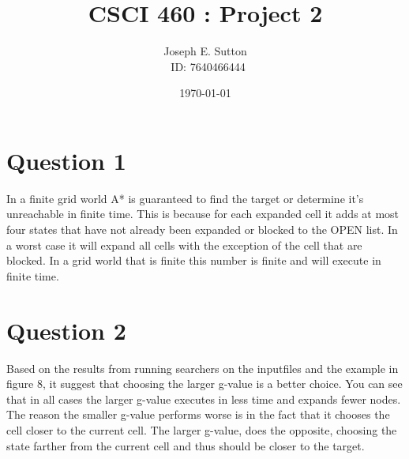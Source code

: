 \documentclass[12pt]{article}
\title{\vspace{-35pt}
         CSCI 460 : Project 2}
\author{
	Joseph E. Sutton\\
	\
	ID: 7640466444
	}
\date{\today}
\begin{document}
\maketitle
\vspace{-45pt}

\def\thesection{}
\section{\hspace{-0.4in} Question 1}
\vspace{-0.1in}
In a finite grid world A* is guaranteed to find the target or determine it's unreachable in finite time. This is because for each expanded cell it adds at most four states that have not already been expanded or blocked to the OPEN list. In a worst case it will expand all cells with the exception of the cell that are blocked. In a grid world that is finite this number is finite and will execute in finite time.

\section{\hspace{-0.4in} Question 2}
\vspace{-0.1in}
Based on the results from running searchers on the inputfiles and the example in figure 8, it suggest that choosing the larger g-value is a better choice. You can see that in all cases the larger g-value executes in less time and expands fewer nodes.  The reason the smaller g-value performs worse is in the fact that it chooses the cell closer to the current cell. The larger g-value, does the opposite, choosing the state farther from the current cell and thus should be closer to the target.
\end{document}
